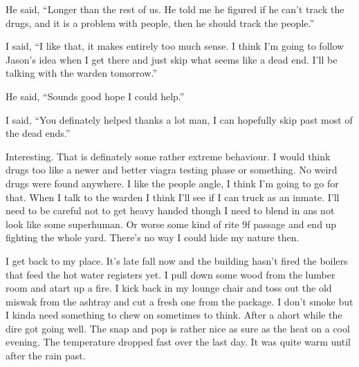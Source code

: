 He said, ``Longer than the rest of us. He told me he figured if he can't track the drugs, and it is a problem with people, then he should track the people.''

I said, ``I like that, it makes entirely too much sense. I think I'm going to follow Jason's idea when I get there and just skip what seems like a dead end. I'll be talking with the warden tomorrow.''

He said, ``Sounds good hope I could help.''

I said, ``You definately helped thanks a lot man, I can hopefully skip past most of the dead ends.''

Interesting. That is definately some rather extreme behaviour. I would think drugs too like a newer and better viagra testing phase or something. No weird drugs were found anywhere. I like the people angle, I think I'm going to go for that. When I talk to the warden I think I'll see if I can truck as an inmate. I'll need to be careful not to get heavy handed though I need to blend in ans not look like some superhuman. Or worse some kind of rite 9f passage and end up fighting the whole yard. There's no way I could hide my nature then.

I get back to my place. It's late fall now and the building hasn't fired the boilers that feed the hot water registers yet. I pull down some wood from the lumber room and atart up a fire. I kick back in my lounge chair and toss out the old miswak from the ashtray and cut a fresh one from the package. I don't smoke but I kinda need something to chew on sometimes to think. After a ahort while the dire got going well. The snap and pop is rather nice as sure as the heat on a cool evening. The temperature dropped fast over the last day. It was quite warm until after the rain past.

